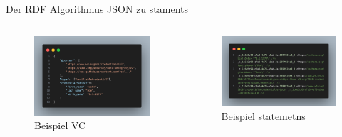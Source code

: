 \documentclass[
	german,%
	authorontitle=true,
	]{bfhbeamer}
\begin{document}
\begin{frame}{Der RDF Algorithmus}
    \centering
    JSON zu staments
    \begin{columns}[onlytextwidth,T]
        \column{70mm}  
        \begin{figure}
            \centering
            \includegraphics[width=70mm]{../img/VCexp.png}
            \caption{Beispiel VC}
        \end{figure}

        \column{70mm}  
        \begin{figure}
            \centering
            \includegraphics[width=70mm]{../img/statements.png}
            \caption{Beispiel statemetns}
        \end{figure}
    \end{columns}
\end{frame}
\end{document}
